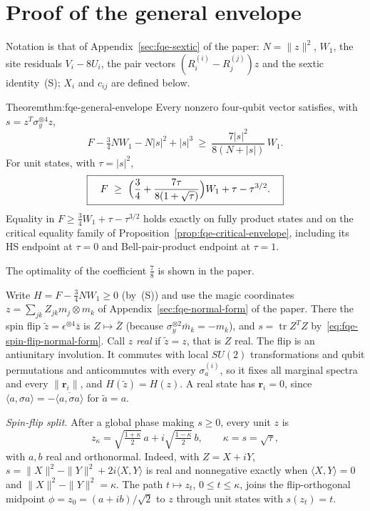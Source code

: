 \section{Proof of the general envelope}\label{sec:sup-general-envelope}
Notation is that of Appendix~\ref{sec:fqe-sextic} of the paper: $N=\lVert z\rVert^2$, $W_1$, the site residuals $V_i-8U_i$, the
pair vectors $(R_i^{(i)}-R_j^{(j)})z$ and the sextic identity~(S); $X_i$ and $c_{ij}$ are defined below.

\begin{restated}{Theorem}{thm:fqe-general-envelope}
Every nonzero four-qubit vector satisfies, with $s=z^T\sigma_y^{\otimes4}z$,
\[
 F-\tfrac34NW_1-N|s|^2+|s|^3\ \ge\ \frac{7|s|^2}{8(N+|s|)}\,W_1 .
 \tag{GE}
\]
For unit states, with $\tau=|s|^2$,
\[
 \boxed{\quad F\ \ge\ \Bigl(\frac34+\frac{7\tau}{8(1+\sqrt\tau)}\Bigr)W_1+\tau-\tau^{3/2}.\quad}
\]
Equality in $F\ge\frac34W_1+\tau-\tau^{3/2}$ holds exactly on fully product states and on the critical
equality family of Proposition~\ref{prop:fqe-critical-envelope}, including its HS endpoint at $\tau=0$ and
Bell-pair-product endpoint at $\tau=1$.
\end{restated}

The optimality of the coefficient $\frac78$ is shown in the paper.

Write $H=F-\frac34NW_1\ge0$ (by~(S)) and use the
magic coordinates $z=\sum_{jk}Z_{jk}m_j\otimes m_k$ of Appendix~\ref{sec:fqe-normal-form} of the paper. There the spin flip
$\tilde z=\epsilon^{\otimes4}\bar z$ is $Z\mapsto\bar Z$ (because $\sigma_y^{\otimes2}\bar m_k=-m_k$), and
$s=\operatorname{tr}Z^TZ$ by~\eqref{eq:fqe-spin-flip-normal-form}. Call $z$ \emph{real} if $\tilde z=z$, that is $Z$ real.
The flip is an antiunitary involution. It commutes with local $SU(2)$ transformations and qubit permutations and anticommutes with every
$\sigma_a^{(i)}$, so it fixes all marginal spectra and every $\|\mathbf r_i\|$, and $H(\tilde z)=H(z)$. A real state has
$\mathbf r_i=0$, since $\langle a,\sigma a\rangle=-\overline{\langle a,\sigma a\rangle}$ for $\tilde a=a$.

\emph{Spin-flip split.} After a global phase making $s\ge0$, every unit $z$ is
\[
 z_\kappa=\sqrt{\tfrac{1+\kappa}2}\,a+i\sqrt{\tfrac{1-\kappa}2}\,b,\qquad \kappa=s=\sqrt\tau,
\]
with $a,b$ real and orthonormal. Indeed, with $Z=X+iY$, $s=\|X\|^2-\|Y\|^2+2i\langle X,Y\rangle$ is real and nonnegative
exactly when $\langle X,Y\rangle=0$ and $\|X\|^2-\|Y\|^2=\kappa$. The path $t\mapsto z_t$, $0\le t\le\kappa$, joins the
flip-orthogonal midpoint $\phi=z_0=(a+ib)/\sqrt2$ to $z$ through unit states with $s(z_t)=t$.


